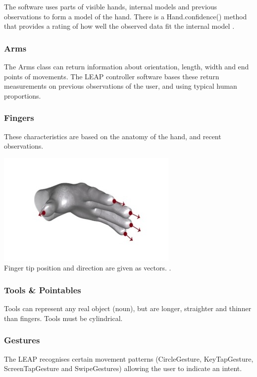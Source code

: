 \documentclass[a4paper, 10pt]{article}
\begin{document}
The software uses parts of visible hands, internal models and previous observations to form a model of the hand. There is a Hand.confidence() method that provides a rating of how well the observed data fit the internal model \cite{leap}.

\subsubsection{Arms}
The Arms class can return information about orientation, length, width and end points of movements. The LEAP controller software bases these return measurements on previous observations of the user, and using typical human proportions.

\subsubsection{Fingers}
These characteristics are based on the anatomy of the hand, and recent observations. 

\begin{center}
\includegraphics[scale=0.4]{fingers}\\
Finger tip position and direction are given as vectors. \cite{leap}.
\end{center}


\subsubsection{Tools \& Pointables}
Tools can represent any real object (noun), but are longer, straighter and thinner than fingers. Tools must be cylindrical.

\subsubsection{Gestures}
The LEAP recognises certain movement patterns (CircleGesture, KeyTapGesture, ScreenTapGesture and SwipeGestures) allowing the user to indicate an intent.
\end{document}
